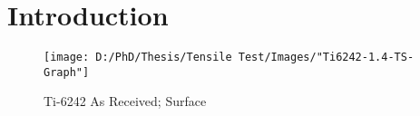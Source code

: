 \chapter{Introduction}

\begin{figure}[H]
    \centering
        \texttt{[image: D:/PhD/Thesis/Tensile Test/Images/"Ti6242-1.4-TS-Graph"]}
        \caption{Ti-6242 As Received; Surface}
    \label{fig:EDM-Cut}
\end{figure}